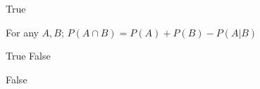 \begin{parts}
\begin{subparts}
\begin{soln}
True
\end{soln}

\subpart[1] \sone For any $A, B$; $P(A\cap B) = P(A) + P(B) - P(A|B)$

\begin{oneparcheckboxes}
\choice True
\choice False
\end{oneparcheckboxes}

\begin{soln}
False
\end{soln}

\end{subparts}

\end{parts}
